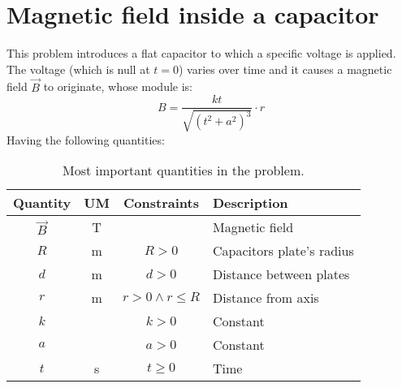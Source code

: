 
\chapter[Magnetism and capacitors]{Magnetic field inside a
capacitor}
\label{ch:magn}

This problem introduces a flat capacitor to which
a specific voltage is applied. The voltage (which is null at $t = 0$)
varies over time and it causes a magnetic field $\vec{B}$ to originate,
whose module is:
\begin{equation}\label{eq:bdef}
    B = \frac{k t}{\sqrt{\left( t^2 + a^2 \right)^3}} \cdot r
\end{equation}
Having the following
quantities:

\begin{table}[h]
\begin{center}
    \footnotesize%
    \begin{tabular}{cccl}
    \toprule
    Quantity & UM & Constraints & Description \\
    \midrule
    $\vec{B}$ & \unit{T} & & Magnetic field \\
    $R$ & \unit{m} & $R > 0$ & Capacitors plate's radius \\
    $d$ & \unit{m} & $d > 0$ & Distance between plates \\
    $r$ & \unit{m} & $r > 0 \wedge r \leq R$ & Distance from axis \\
    $k$ & & $k > 0$ & Constant \\
    $a$ & & $a > 0$ & Constant \\
    $t$ & \unit{s} & $t \geq 0$ & Time \\
    \bottomrule
    \end{tabular}
\end{center}
\caption{Most important quantities in the problem.}
\label{tab:quants}
\end{table}

